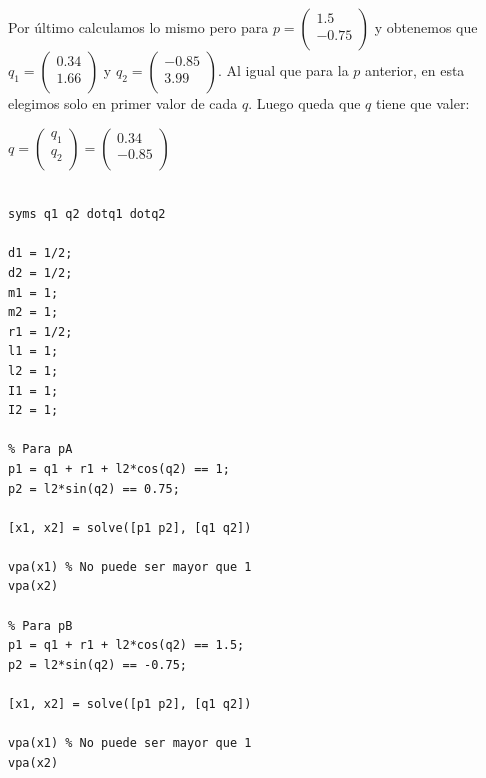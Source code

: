 \documentclass[a4paper]{article}
\begin{document}
\begin{itemize}
Por último calculamos lo mismo pero para $ p = \begin{pmatrix}
	1.5\\       
	-0.75\\       
\end{pmatrix}$ y obtenemos que $q_{1} = \begin{pmatrix}
0.34\\       
1.66\\       
\end{pmatrix}$ y $q_{2}=\begin{pmatrix}       
-0.85\\  
3.99\\     
\end{pmatrix}$. Al igual que para la $p$ anterior, en esta elegimos solo en primer valor de cada $q$. Luego queda que $q$ tiene que valer:

\begin{center}
	$q = \begin{pmatrix}
		q_{1}\\       
		q_{2}\\       
	\end{pmatrix} = \begin{pmatrix}
		0.34\\       
		-0.85\\       
	\end{pmatrix}$
\end{center}

\bigskip

\begin{tcolorbox}[width=12cm, title={File \texttt{answer\_4.m}}]
\begin{scriptsize}
\begin{verbatim}

syms q1 q2 dotq1 dotq2

d1 = 1/2;
d2 = 1/2;
m1 = 1;
m2 = 1;
r1 = 1/2;
l1 = 1;
l2 = 1;
I1 = 1;
I2 = 1;

% Para pA
p1 = q1 + r1 + l2*cos(q2) == 1;
p2 = l2*sin(q2) == 0.75;

[x1, x2] = solve([p1 p2], [q1 q2])

vpa(x1) % No puede ser mayor que 1
vpa(x2)

% Para pB
p1 = q1 + r1 + l2*cos(q2) == 1.5;
p2 = l2*sin(q2) == -0.75;

[x1, x2] = solve([p1 p2], [q1 q2])

vpa(x1) % No puede ser mayor que 1
vpa(x2)

\end{verbatim}
\end{scriptsize}
\end{tcolorbox}



\end{itemize}
\end{document}
